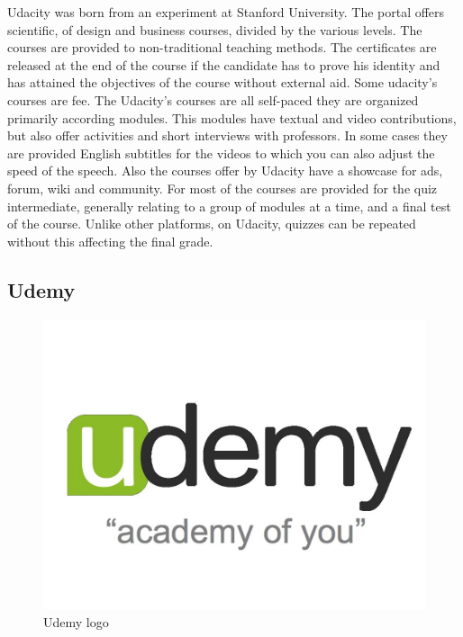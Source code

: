 Udacity was born from an experiment at Stanford University. The portal offers scientific, of design and business courses, divided by the various levels. The courses are provided to non-traditional teaching methods.
The certificates are released at the end of the course if the candidate has to prove his identity and has attained the objectives of the course without external aid. Some udacity's courses are fee.
The Udacity’s courses are all self-paced they are organized primarily according modules. This modules have textual and video contributions, but also offer activities and short interviews with professors. In some cases they are provided English subtitles for the videos to which you can also adjust the speed of the speech.
Also the courses offer by Udacity have a showcase for ads, forum, wiki and community. For most of the courses are provided for the quiz intermediate, generally relating to a group of modules at a time, and a final test of the course. Unlike other platforms, on Udacity, quizzes can be repeated without this affecting the final grade.

\subsection{Udemy}
\label{subsec:udemy}
\begin{figure}[htb] %
 \centering
 \includegraphics[width=1.0\linewidth]{images/chapter1/udemy.jpg}\hfill
 \caption[Udemy logo]{Udemy logo}
 \label{fig:fourV}
\end{figure}

